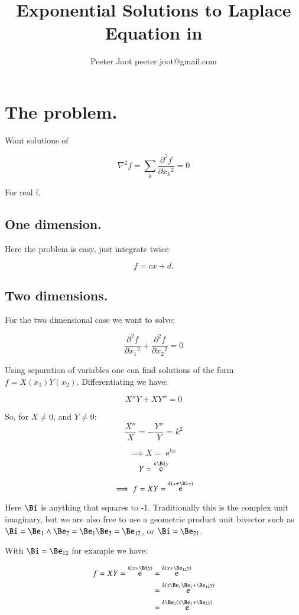 \documentclass{article}      %
\title{Exponential Solutions to Laplace Equation in \R{N}}
\author{Peeter Joot \quad peeter.joot@gmail.com}         %
\newcommand{\laplacian}[0]{\nabla^2}
\newcommand{\dsqxj}[2] {\frac {\partial^2 {#1}} {\partial {x_{#2}}^2}}
\DeclareMathOperator{\Exp}{e}
\begin{document}

\maketitle{}

\section{ The problem. }

Want solutions of

\begin{equation}\label{eqn:laplacian}
\laplacian f = \sum_k \dsqxj{f}{k} = 0
\end{equation}

For real f.

\subsection{ One dimension. }

Here the problem is easy, just integrate twice:

\[
f = cx + d.
\]

\subsection{ Two dimensions. }

For the two dimensional case we want to solve:

\[
\dsqxj{f}{1} + \dsqxj{f}{2} = 0
\]

Using separation of variables one can find solutions of the form $f = X(x_1)Y(x_2)$.  Differentiating we have:

\[
X''Y + XY'' = 0
\]

So, for $X \ne 0$, and $Y \ne 0$:
\[
\frac{X''}{X} = -\frac{Y''}{Y} = k^2
\]

\[
\implies
X = \Exp^{kx}
\]
\[
Y = \Exp^{k\Bi y}
\]

\[
\implies
f = XY = \Exp^{k(x + \Bi y)}
\]

Here $\Bi$ is anything that squares to -1.  Traditionally this is the
complex unit imaginary, but we are also free to use a geometric product unit bivector such as $\Bi = \Be_1 \wedge \Be_2 = \Be_1\Be_2 = \Be_{12}$, or $\Bi = \Be_{21}$.

With $\Bi = \Be_{12}$ for example we have:

\begin{align*}
f = XY = \Exp^{k(x + \Bi y)}
&= \Exp^{k(x + \Be_{12} y)} \\
&= \Exp^{k(x\Be_{1}\Be_1 + \Be_{12} y)} \\
&= \Exp^{k\Be_1(x\Be_1 + \Be_2 y)} \\
\end{align*}
\end{document}
